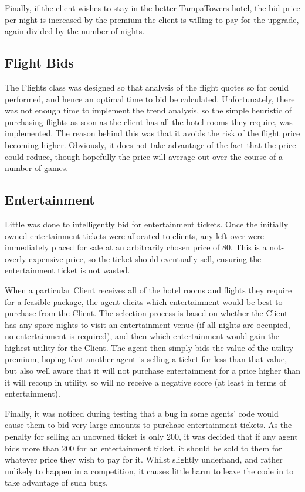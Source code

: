 \documentclass{acm_proc_article-sp}
\begin{document}
  Finally, if the client wishes to stay in the better TampaTowers hotel, the bid price per night is increased by the premium the client is willing to pay for the upgrade, again divided by the number of nights.
  
 \subsection{Flight Bids}
  The Flights class was designed so that analysis of the flight quotes so far could performed, and hence an optimal time to bid be calculated.  Unfortunately, there was not enough time to implement the trend analysis, so the simple heuristic of purchasing flights as soon as the client has all the hotel rooms they require, was implemented.  The reason behind this was that it avoids the risk of the flight price becoming higher.  Obviously, it does not take advantage of the fact that the price could reduce, though hopefully the price will average out over the course of a number of games.
  
 \subsection{Entertainment}
  Little was done to intelligently bid for entertainment tickets.  Once the initially owned entertainment tickets were allocated to clients, any left over were immediately placed for sale at an arbitrarily chosen price of 80.  This is a not-overly expensive price, so the ticket should eventually sell, ensuring the entertainment ticket is not wasted.
  
  When a particular Client receives all of the hotel rooms and flights they require for a feasible package, the agent elicits which entertainment would be best to purchase from the Client.  The selection process is based on whether the Client has any spare nights to visit an entertainment venue (if all nights are occupied, no entertainment is required), and then which entertainment would gain the highest utility for the Client.  The agent then simply bids the value of the utility premium, hoping that another agent is selling a ticket for less than that value, but also well aware that it will not purchase entertainment for a price higher than it will recoup in utility, so will no receive a negative score (at least in terms of entertainment).
  
  Finally, it was noticed during testing that a bug in some agents' code would cause them to bid very large amounts to purchase entertainment tickets.  As the penalty for selling an unowned ticket is only 200, it was decided that if any agent bids more than 200 for an entertainment ticket, it should be sold to them for whatever price they wish to pay for it.  Whilst slightly underhand, and rather unlikely to happen in a competition, it causes little harm to leave the code in to take advantage of such bugs.
\end{document}
